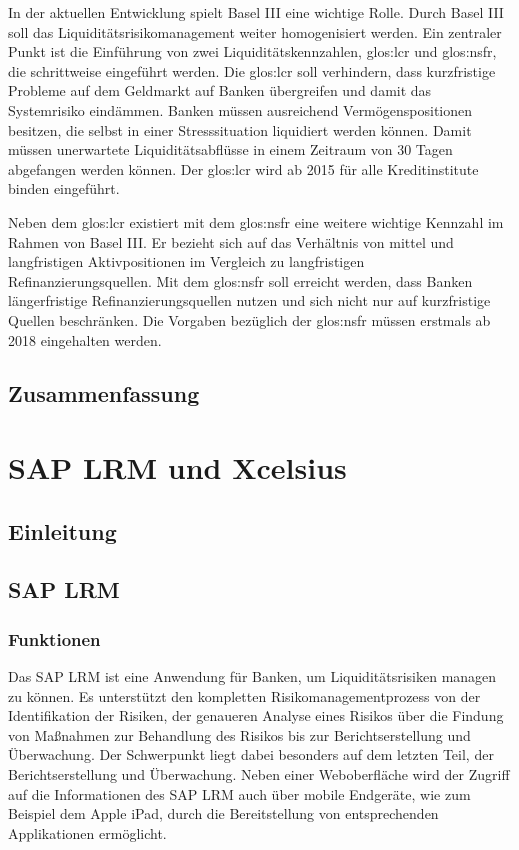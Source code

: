 \begin{onehalfspacing}
In der aktuellen Entwicklung spielt Basel III eine wichtige Rolle. Durch Basel III soll das Liquiditätsrisikomanagement weiter homogenisiert werden. Ein zentraler Punkt ist die Einführung von zwei Liquiditätskennzahlen, \gls{glos:lcr} und \gls{glos:nsfr}, die schrittweise eingeführt werden. Die \gls{glos:lcr} soll verhindern, dass kurzfristige Probleme auf dem Geldmarkt auf Banken übergreifen und damit das Systemrisiko eindämmen. Banken müssen ausreichend Vermögenspositionen besitzen, die selbst in einer Stresssituation liquidiert werden können. Damit müssen unerwartete Liquiditätsabflüsse in einem Zeitraum von 30 Tagen abgefangen werden können. Der \gls{glos:lcr} wird ab 2015 für alle Kreditinstitute binden eingeführt.

Neben dem \gls{glos:lcr} existiert mit dem \gls{glos:nsfr} eine weitere wichtige Kennzahl im Rahmen von Basel III. Er bezieht sich auf das Verhältnis von mittel und langfristigen Aktivpositionen im Vergleich zu langfristigen Refinanzierungsquellen. Mit dem \gls{glos:nsfr} soll erreicht werden, dass Banken längerfristige Refinanzierungsquellen nutzen und sich nicht nur auf kurzfristige Quellen beschränken. Die Vorgaben bezüglich der \gls{glos:nsfr} müssen erstmals ab 2018 eingehalten werden.

\section{Zusammenfassung}

\chapter{SAP LRM und Xcelsius}
\section{Einleitung}
\section{SAP LRM}

\subsection{Funktionen}
Das SAP LRM ist eine Anwendung für Banken, um Liquiditätsrisiken managen zu können. Es unterstützt den kompletten Risikomanagementprozess von der Identifikation der Risiken, der genaueren Analyse eines Risikos über die Findung von Maßnahmen zur Behandlung des Risikos bis zur Berichtserstellung und Überwachung. Der Schwerpunkt liegt dabei besonders auf dem letzten Teil, der Berichtserstellung und Überwachung. Neben einer Weboberfläche wird der Zugriff auf die Informationen des SAP LRM auch über mobile Endgeräte, wie zum Beispiel dem Apple iPad, durch die Bereitstellung von entsprechenden Applikationen ermöglicht.


\end{onehalfspacing}
